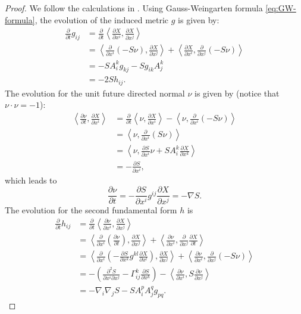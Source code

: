 \documentclass[10pt,a4paper]{amsart}
\newcommand{\pd}[2]{\frac{\partial {#1}}{\partial {#2}}}
\newcommand{\ip}[2]{\ensuremath{\left< {#1}, {#2} \right>}}
\numberwithin{equation}{section}
\begin{document}
\begin{proof}
We follow the calculations in \cite{co-compact}. Using Gauss-Weingarten formula \eqref{eq:GW-formula}, the evolution of the induced metric \(g\) is given by:
\begin{equation}
    \begin{aligned}
        \pd{}{t}g_{ij} &= \pd{}{t}\ip{\pd{X}{x^i}}{\pd{X}{x^j}} \\
        &= \ip{\pd{}{x^i}(-S\nu)}{\pd{X}{x^j}} + \ip{\pd{X}{x^i}}{\pd{}{x^j}(-S\nu)} \\
        &= -SA_i^k g_{kj} - S g_{ik}A_j^k \\
        &= -2Sh_{ij}.
    \end{aligned}
\end{equation}
The evolution for the unit future directed normal \(\nu\) is given by (notice that \(\nu \cdot \nu = -1\)):  
\begin{equation*}
    \begin{aligned}
        \ip{\pd{\nu}{t}}{\pd{X}{x^i}} &= \pd{}{t}\ip{\nu}{\pd{X}{x^i}} - \ip{\nu}{\pd{}{x^i}(-S\nu)} \\
        &= \ip{\nu}{\pd{}{x^i}(S\nu)} \\
        &= \ip{\nu}{\pd{S}{x^i}\nu + SA_i^k \pd{X}{x^k}} \\
        &= -\pd{S}{x^i},
    \end{aligned}
\end{equation*}
which leads to 
\begin{equation}
    \pd{\nu}{t} = -\pd{S}{x^i} g^{ij} \pd{X}{x^j} = -\nabla S.
\end{equation}
The evolution for the second fundamental form \(h\) is
\begin{equation}
    \begin{aligned}
        \pd{}{t}h_{ij} &= \pd{}{t}\ip{\pd{\nu}{x^i}}{\pd{X}{x^j}} \\
        &= \ip{\pd{}{x^i}\left(\pd{\nu}{t}\right)}{\pd{X}{x^j}} + \ip{\pd{\nu}{x^i}}{\pd{}{x^j}\pd{X}{t}} \\
        &= \ip{\pd{}{x^i}\left(-\pd{S}{x^k}g^{kl}\pd{X}{x^l} \right)}{\pd{X}{x^j}} + \ip{\pd{\nu}{x^i}}{\pd{}{x^j}(-S\nu)}\\
        &= -\left(\frac{\partial^2 S}{\partial x^i \partial x^j} - \Gamma_{ij}^k \pd{S}{x^k} \right) - \ip{\pd{\nu}{x^i}}{S \pd{\nu}{x^j}} \\
        &= -\nabla_i\nabla_j S - SA_i^p A_j^q g_{pq}.
    \end{aligned}
\end{equation}


\end{proof}
\end{document}
